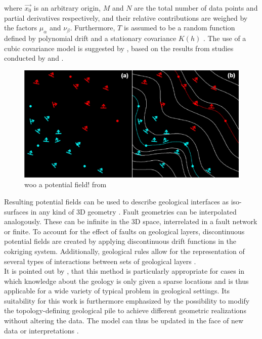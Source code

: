         where $\vec{x_0}$ is an arbitrary origin, $M$ and $N$ are the total number of data points and partial derivatives respectively, and their relative contributions are weighed by the factors $\mu_\alpha$ and $\nu_\beta$. Furthermore, $T$ is assumed to be a random function defined by polynomial drift and a stationary covariance $K(h)$ \citep{calcagno2008geological}. The use of a cubic covariance model is suggested by \citet{calcagno2008geological}, based on the results from studies conducted by \citet{aug2004modelisation} and \citet{chiles2004modelling}.\\
		\begin{figure}[h]
			\centering
			\includegraphics[width=1\textwidth]{Figures/calcagno_pot_field.png}
			\caption{woo a potential field! from \citet{calcagno2008geological}}\label{fig:pot_field}
		\end{figure}        
        Resulting potential fields can be used to describe geological interfaces as iso-surfaces in any kind of 3D geometry \citep{calcagno2008geological}. Fault geometries can be interpolated analogously. These can be infinite in the 3D space, interrelated in a fault network or finite. To account for the effect of faults on geological layers, discontinuous potential fields are created by applying discontinuous drift functions in the cokriging system. Additionally, geological rules allow for the representation of several types of interactions between sets of geological layers \citep{calcagno2008geological}.\\
        It is pointed out by \citet{calcagno2008geological}, that this method is particularly appropriate for cases in which knowledge about the geology is only given a sparse locations and is thus applicable for a wide variety of typical problem in geological settings. Its suitability for this work is furthermore emphasized by the possibility to modify the topology-defining geological pile to achieve different geometric realizations without altering the data. The model can thus be updated in the face of new data or interpretations \citep{calcagno2008geological}.
        
